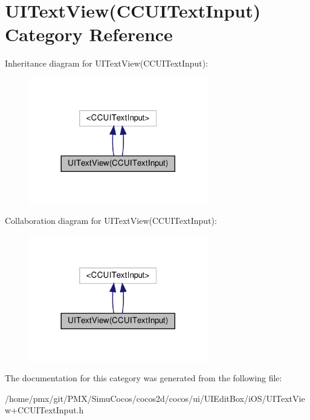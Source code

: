 \hypertarget{categoryUITextView_07CCUITextInput_08}{}\section{U\+I\+Text\+View(C\+C\+U\+I\+Text\+Input) Category Reference}
\label{categoryUITextView_07CCUITextInput_08}


Inheritance diagram for U\+I\+Text\+View(C\+C\+U\+I\+Text\+Input)\+:
\nopagebreak
\begin{figure}[H]
\begin{center}
\leavevmode
\includegraphics[width=221pt]{categoryUITextView_07CCUITextInput_08__inherit__graph}
\end{center}
\end{figure}


Collaboration diagram for U\+I\+Text\+View(C\+C\+U\+I\+Text\+Input)\+:
\nopagebreak
\begin{figure}[H]
\begin{center}
\leavevmode
\includegraphics[width=221pt]{categoryUITextView_07CCUITextInput_08__coll__graph}
\end{center}
\end{figure}


The documentation for this category was generated from the following file\+:\begin{DoxyCompactItemize}
\item 
/home/pmx/git/\+P\+M\+X/\+Simu\+Cocos/cocos2d/cocos/ui/\+U\+I\+Edit\+Box/i\+O\+S/U\+I\+Text\+View+\+C\+C\+U\+I\+Text\+Input.\+h\end{DoxyCompactItemize}
